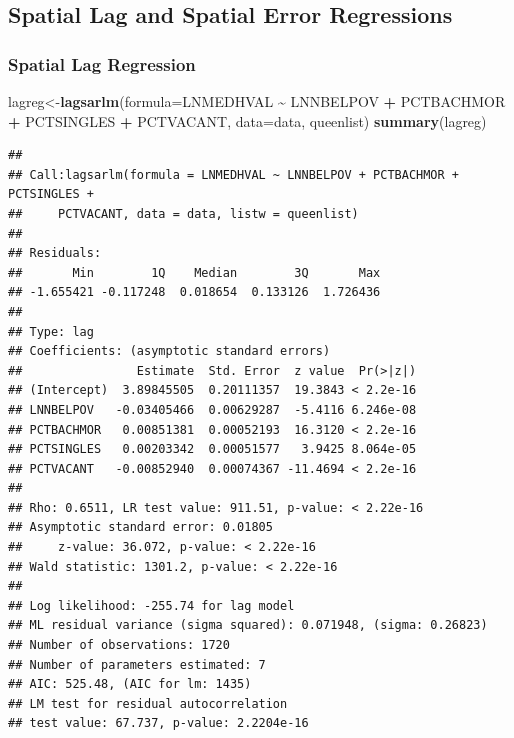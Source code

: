 \documentclass[
]{article}
\newenvironment{Shaded}{\begin{snugshade}}{\end{snugshade}}
\newcommand{\AttributeTok}[1]{\textcolor[rgb]{0.13,0.29,0.53}{#1}}
\newcommand{\FunctionTok}[1]{\textcolor[rgb]{0.13,0.29,0.53}{\textbf{#1}}}
\newcommand{\NormalTok}[1]{#1}
\newcommand{\OtherTok}[1]{\textcolor[rgb]{0.56,0.35,0.01}{#1}}
\newcommand{\SpecialCharTok}[1]{\textcolor[rgb]{0.81,0.36,0.00}{\textbf{#1}}}
\begin{document}
\hypertarget{spatial-lag-and-spatial-error-regressions}{%
\subsection{Spatial Lag and Spatial Error
Regressions}\label{spatial-lag-and-spatial-error-regressions}}

\hypertarget{spatial-lag-regression}{%
\subsubsection{Spatial Lag Regression}\label{spatial-lag-regression}}

\begin{Shaded}
\begin{Highlighting}[]
\NormalTok{lagreg}\OtherTok{\textless{}{-}}\FunctionTok{lagsarlm}\NormalTok{(}\AttributeTok{formula=}\NormalTok{LNMEDHVAL }\SpecialCharTok{\textasciitilde{}}\NormalTok{ LNNBELPOV }\SpecialCharTok{+}\NormalTok{ PCTBACHMOR }\SpecialCharTok{+}\NormalTok{ PCTSINGLES }\SpecialCharTok{+}\NormalTok{ PCTVACANT, }\AttributeTok{data=}\NormalTok{data, queenlist)}
\FunctionTok{summary}\NormalTok{(lagreg)}
\end{Highlighting}
\end{Shaded}

\begin{verbatim}
## 
## Call:lagsarlm(formula = LNMEDHVAL ~ LNNBELPOV + PCTBACHMOR + PCTSINGLES + 
##     PCTVACANT, data = data, listw = queenlist)
## 
## Residuals:
##       Min        1Q    Median        3Q       Max 
## -1.655421 -0.117248  0.018654  0.133126  1.726436 
## 
## Type: lag 
## Coefficients: (asymptotic standard errors) 
##                Estimate  Std. Error  z value  Pr(>|z|)
## (Intercept)  3.89845505  0.20111357  19.3843 < 2.2e-16
## LNNBELPOV   -0.03405466  0.00629287  -5.4116 6.246e-08
## PCTBACHMOR   0.00851381  0.00052193  16.3120 < 2.2e-16
## PCTSINGLES   0.00203342  0.00051577   3.9425 8.064e-05
## PCTVACANT   -0.00852940  0.00074367 -11.4694 < 2.2e-16
## 
## Rho: 0.6511, LR test value: 911.51, p-value: < 2.22e-16
## Asymptotic standard error: 0.01805
##     z-value: 36.072, p-value: < 2.22e-16
## Wald statistic: 1301.2, p-value: < 2.22e-16
## 
## Log likelihood: -255.74 for lag model
## ML residual variance (sigma squared): 0.071948, (sigma: 0.26823)
## Number of observations: 1720 
## Number of parameters estimated: 7 
## AIC: 525.48, (AIC for lm: 1435)
## LM test for residual autocorrelation
## test value: 67.737, p-value: 2.2204e-16
\end{verbatim}
\end{document}
